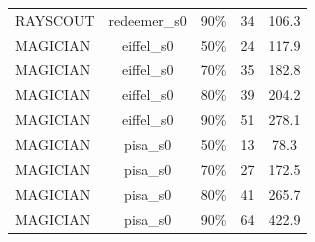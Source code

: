 \begin{tabular}{@{}lcccc@{}}
RAYSCOUT & redeemer\_s0 & 90\% & 34 & 106.3 \\
MAGICIAN & eiffel\_s0 & 50\% & 24 & 117.9 \\
MAGICIAN & eiffel\_s0 & 70\% & 35 & 182.8 \\
MAGICIAN & eiffel\_s0 & 80\% & 39 & 204.2 \\
MAGICIAN & eiffel\_s0 & 90\% & 51 & 278.1 \\
MAGICIAN & pisa\_s0 & 50\% & 13 & 78.3 \\
MAGICIAN & pisa\_s0 & 70\% & 27 & 172.5 \\
MAGICIAN & pisa\_s0 & 80\% & 41 & 265.7 \\
MAGICIAN & pisa\_s0 & 90\% & 64 & 422.9 \\
\bottomrule
\end{tabular}
